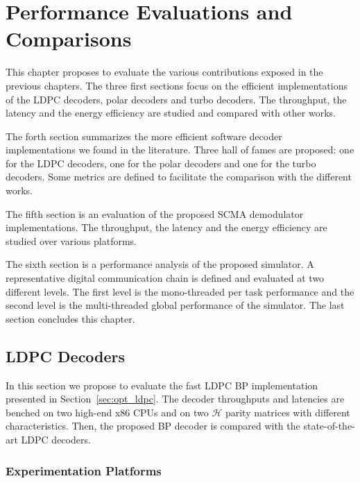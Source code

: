 
\renewcommand{\curChapter}{main/chapter4}

\chapter{Performance Evaluations and Comparisons}
\label{chap:eval}

This chapter proposes to evaluate the various contributions exposed in the
previous chapters. The three first sections focus on the efficient
implementations of the LDPC decoders, polar decoders and turbo decoders. The
throughput, the latency and the energy efficiency are studied and compared with
other works.

The forth section summarizes the more efficient software decoder implementations
we found in the literature. Three hall of fames are proposed: one for the LDPC
decoders, one for the polar decoders and one for the turbo decoders. Some
metrics are defined to facilitate the comparison with the different works.

The fifth section is an evaluation of the proposed SCMA demodulator
implementations. The throughput, the latency and the energy efficiency are
studied over various platforms.

The sixth section is a performance analysis of the proposed \AFFECT simulator.
A representative digital communication chain is defined and evaluated at
two different levels. The first level is the mono-threaded per task performance
and the second level is the multi-threaded global performance of the simulator.
The last section concludes this chapter.

\vspace*{\fill}
\minitoccustom
\vspace*{\fill}

\newpage
\section{LDPC Decoders}
\label{sec:eval_ldpc}

In this section we propose to evaluate the fast LDPC BP implementation presented
in Section~\ref{sec:opt_ldpc}. The decoder throughputs and latencies are benched
on two high-end x86 CPUs and on two $\mathcal{H}$ parity matrices with different
characteristics. Then, the proposed BP decoder is compared with the
state-of-the-art LDPC decoders.

\subsection{Experimentation Platforms}

